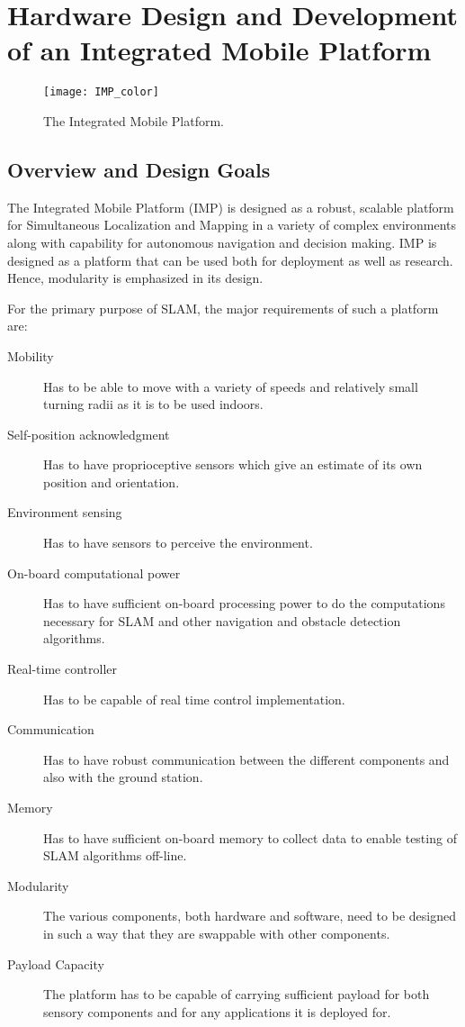 \chapter{Hardware Design and Development of an Integrated Mobile Platform}
\label{cha:Platform }


\begin{figure}
\centering
\texttt{[image: IMP\_color]}
\caption{The Integrated Mobile Platform.}
\label{fig:IMP_color}
\end{figure}
\section{Overview and Design Goals}

The Integrated Mobile Platform (IMP) is designed as a robust, scalable platform for Simultaneous Localization and Mapping in a variety of complex environments along with capability for autonomous navigation and decision making. IMP is designed as a platform that can be used both for deployment as well as research. Hence, modularity is emphasized in its design. 

For the primary purpose of SLAM, the major requirements of such a platform are:
\begin{description}
	\item[Mobility] Has to be able to move with a variety of speeds and relatively small turning radii as it is to be used indoors. 
	\item[Self-position acknowledgment] Has to have proprioceptive sensors which give an estimate of its own position and orientation.
	\item[Environment sensing] Has to have sensors to perceive the environment. 
	\item[On-board computational power] Has to have sufficient on-board processing power to do the computations necessary for SLAM and other navigation and obstacle detection algorithms.
	\item[Real-time controller] Has to be capable of real time control implementation.
	\item[Communication] Has to have robust communication between the different components and also with the ground station. 
	\item[Memory] Has to have sufficient on-board memory to collect data to enable testing of SLAM algorithms off-line.  
	\item[Modularity] The various components, both hardware and software, need to be designed in such a way that they are swappable with other components.
	\item[Payload Capacity] The platform has to be capable of carrying sufficient payload for both sensory components and for any applications it is deployed for.
\end{description}

